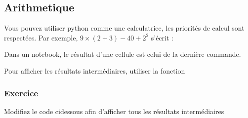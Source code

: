 \documentclass[letterpaper,10pt,english]{sphinxmanual}
\begin{document}
\subsection{Arithmetique}
\label{\detokenize{src/OCI01_Introduction:arithmetique}}
Vous pouvez utiliser python comme une calculatrice, les priorités de calcul sont respectées.
Par exemple, \(9 \times (2+3) -40 +2^2\) s’écrit :

\begin{sphinxVerbatim}[commandchars=\\\{\}]
        
\end{sphinxVerbatim}

Dans un notebook, le résultat d’une cellule est celui de la dernière commande.

\begin{sphinxVerbatim}[commandchars=\\\{\}]
  
    
      
\end{sphinxVerbatim}

Pour afficher les résultats intermédiaires, utiliser la fonction 

\begin{sphinxVerbatim}[commandchars=\\\{\}]
  
\end{sphinxVerbatim}


\subsubsection{Exercice}
\label{\detokenize{src/OCI01_Introduction:exercice}}
Modifiez le code ci\sphinxhyphen{}dessous afin d’afficher tous les résultats intermédiaires

\begin{sphinxVerbatim}[commandchars=\\\{\}]
\end{sphinxVerbatim}
\end{document}
